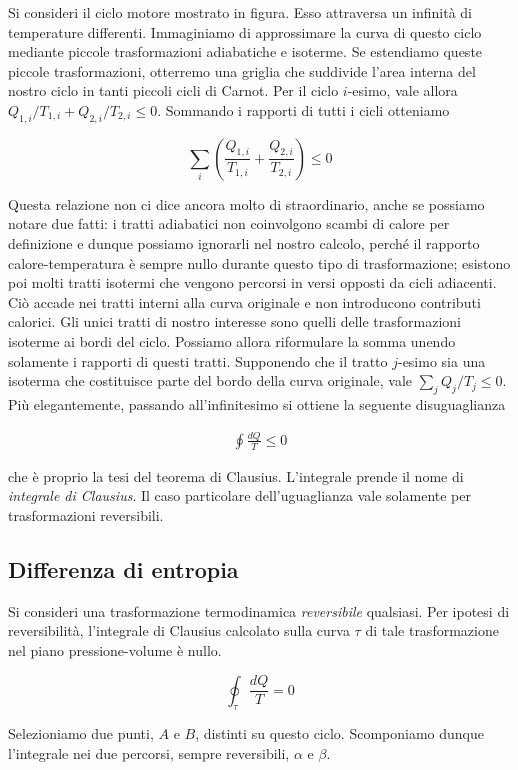 Si consideri il ciclo motore mostrato in figura. Esso attraversa
un infinità di temperature differenti. Immaginiamo di approssimare
la curva di questo ciclo mediante piccole trasformazioni adiabatiche
e isoterme. Se estendiamo queste piccole trasformazioni, otterremo
una griglia che suddivide l'area interna del nostro ciclo in tanti
piccoli cicli di Carnot. Per il ciclo $i$-esimo, vale allora
$Q_{1,i}/T_{1,i} + Q_{2,i}/T_{2,i} \leq 0$. Sommando i rapporti di
tutti i cicli otteniamo

\[ \sum_i \left(\frac{Q_{1,i}}{T_{1,i}} + \frac{Q_{2,i}}{T_{2,i}}\right) \leq 0 \]

\noindent Questa relazione non ci dice ancora molto di straordinario,
anche se possiamo notare due fatti: i tratti adiabatici non coinvolgono
scambi di calore per definizione e dunque possiamo ignorarli nel
nostro calcolo, perché il rapporto calore-temperatura è sempre nullo
durante questo tipo di trasformazione; esistono poi molti tratti
isotermi che vengono percorsi in versi opposti da cicli adiacenti.
Ciò accade nei tratti interni alla curva originale e non introducono
contributi calorici. Gli unici tratti di nostro interesse sono
quelli delle trasformazioni isoterme ai bordi del ciclo. Possiamo
allora riformulare la somma unendo solamente i rapporti di questi
tratti. Supponendo che il tratto $j$-esimo sia una isoterma che
costituisce parte del bordo della curva originale, vale
$\sum_j Q_j/T_j \leq 0$. Più elegantemente, passando all'infinitesimo
si ottiene la seguente disuguaglianza

\begin{align}
    \oint \frac{dQ}{T} \leq 0
\end{align}

\noindent che è proprio la tesi del teorema di Clausius. L'integrale
prende il nome di \textit{integrale di Clausius}. Il caso particolare
dell'uguaglianza vale solamente per trasformazioni reversibili.

\subsection{Differenza di entropia}
Si consideri una trasformazione termodinamica \textit{reversibile} qualsiasi.
Per ipotesi di reversibilità, l'integrale di Clausius calcolato sulla curva $\tau$
di tale trasformazione nel piano pressione-volume è nullo.

\[ \oint_\tau \frac{dQ}{T} = 0 \]

\noindent Selezioniamo due punti, $A$ e $B$, distinti su questo ciclo. Scomponiamo
dunque l'integrale nei due percorsi, sempre reversibili, $\alpha$ e $\beta$.


